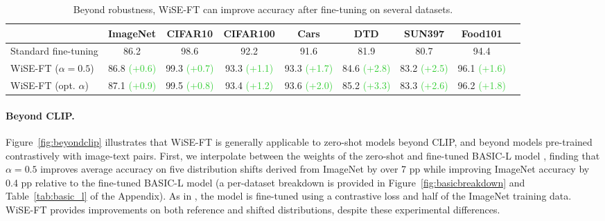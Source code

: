\begin{table}
\setlength\tabcolsep{3.5pt}
\begin{center}
\small
\begin{tabular}{l@{\hskip .2in}c@{\hskip .2in}ccccccc}
\toprule
{} &     ImageNet &      CIFAR10 &     CIFAR100 &         Cars &          DTD &       SUN397 &      Food101 \\          \midrule                                                                             Standard fine-tuning    &         86.2 &                                            98.6 &                                            92.2 &                                            91.6 &                                            81.9 &                                            80.7 &                                            94.4 \\                   WiSE-FT ($\alpha{=}0.5$) &  86.8 {\scriptsize\textcolor{LimeGreen}{(+0.6)}} &  99.3 {\scriptsize\textcolor{LimeGreen}{(+0.7)}} &  93.3 {\scriptsize\textcolor{LimeGreen}{(+1.1)}} &  93.3 {\scriptsize\textcolor{LimeGreen}{(+1.7)}} &  84.6 {\scriptsize\textcolor{LimeGreen}{(+2.8)}} &  83.2 {\scriptsize\textcolor{LimeGreen}{(+2.5)}} &  96.1 {\scriptsize\textcolor{LimeGreen}{(+1.6)}} \\                                                         WiSE-FT (opt. $\alpha$)  &  87.1 {\scriptsize\textcolor{LimeGreen}{(+0.9)}} &  99.5 {\scriptsize\textcolor{LimeGreen}{(+0.8)}} &  93.4 {\scriptsize\textcolor{LimeGreen}{(+1.2)}} &  93.6 {\scriptsize\textcolor{LimeGreen}{(+2.0)}} &  85.2 {\scriptsize\textcolor{LimeGreen}{(+3.3)}} &  83.3 {\scriptsize\textcolor{LimeGreen}{(+2.6)}} &  96.2 {\scriptsize\textcolor{LimeGreen}{(+1.8)}} \\  
\bottomrule
\end{tabular}
\caption{\label{tab:id_gains} Beyond robustness, WiSE-FT can improve accuracy after fine-tuning on several datasets.}%
\end{center}
\end{table}


\paragraph{Beyond CLIP.} Figure~\ref{fig:beyondclip} illustrates that WiSE-FT is generally applicable to zero-shot models beyond CLIP, and beyond models pre-trained contrastively with image-text pairs. First, we interpolate between the weights of the zero-shot and fine-tuned BASIC-L model \cite{pham2021scaling}, finding that $\alpha{=}0.5$ improves average accuracy on five distribution shifts derived from ImageNet by over 7 pp while improving ImageNet accuracy by 0.4 pp relative to the fine-tuned BASIC-L model (a per-dataset breakdown is provided in Figure~\ref{fig:basicbreakdown} and Table~\ref{tab:basic_l} of the Appendix).
As in \citet{pham2021scaling}, the model is fine-tuned using a contrastive loss and half of the ImageNet training data. 
WiSE-FT provides improvements on both reference and shifted distributions, despite these experimental differences.

